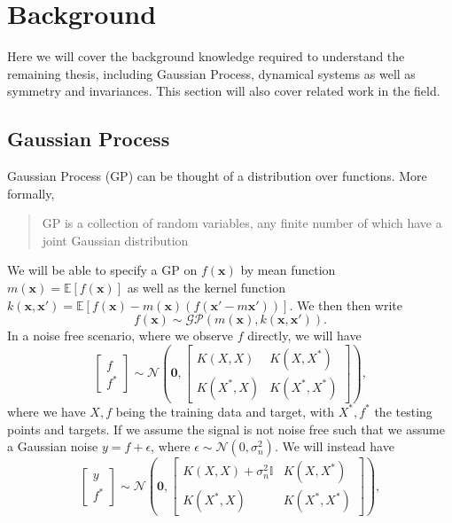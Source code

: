 \documentclass{statsmsc}
\begin{document}
 
\chapter{Background}
Here we will cover the background knowledge required to understand the remaining thesis, including Gaussian Process, dynamical systems as well as symmetry and invariances. 
This section will also cover related work in the field.


\section{Gaussian Process}
Gaussian Process (GP) can be thought of a distribution over functions. \cite{rasmussen_williams_2006}
More formally, \begin{quote}GP is a collection of random variables, any finite number of which have a joint Gaussian distribution\end{quote}
We will be able to specify a GP on $f(\mathbf{x})$ by mean function $m(\mathbf{x})=\mathbb{E}[f(\mathbf{x})]$ as well as the kernel function $k(\mathbf{x}, \mathbf{x'})=\mathbb{E}[f(\mathbf{x})-m(\mathbf{x})(f(\mathbf{x'}-m{\mathbf{x'}}))]$.
We then then write
$$
f(\mathbf{x})\sim\mathcal{GP}(m(\mathbf{x}),k(\mathbf{x},\mathbf{x'})).
$$
In a noise free scenario, where we observe $f$ directly, we will have
$$
\begin{bmatrix}
  f\\f^*
\end{bmatrix}
\sim \mathcal{N}
\left(\mathbf{0}, \begin{bmatrix}K(X, X) & K(X, X^*) \\ K(X^*, X) & K(X^*, X^*) \end{bmatrix}\right),
$$
where we have $X, f$ being the training data and target, with $X^*, f^*$ the testing points and targets.
If we assume the signal is not noise free such that we assume a Gaussian noise $y=f+\epsilon$, where $\epsilon\sim\mathcal{N}(0, \sigma_n^2)$.
We will instead have
$$
\begin{bmatrix}
  y\\f^*
\end{bmatrix}
\sim \mathcal{N}
\left(\mathbf{0}, \begin{bmatrix}K(X, X)+\sigma^2_n\mathbb{I} & K(X, X^*) \\ K(X^*, X) & K(X^*, X^*) \end{bmatrix}\right),
$$
\end{document}
